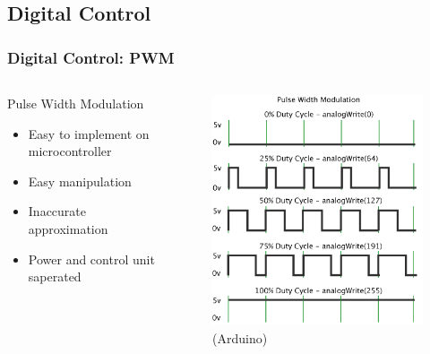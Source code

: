 \documentclass[compress, aspectratio=32]{beamer}
\begin{document}
\subsection{Digital Control}
\begin{frame}
    \frametitle{Digital Control: PWM}
    \begin{columns}
        \begin{column}[]{0.5\textwidth}
            Pulse Width Modulation
            \begin{itemize}
                \item Easy to implement on microcontroller
                \item Easy manipulation
                \item Inaccurate approximation
                \item Power and control unit saperated
            \end{itemize}
        \end{column}
        \begin{column}[]{0.5\textwidth}
            \begin{figure}
        \centering
        \includegraphics[height=0.7\textheight]{pwm.png}
        \caption*{(Arduino)}
    \end{figure}
        \end{column}
    \end{columns}    
\end{frame}
\end{document}
